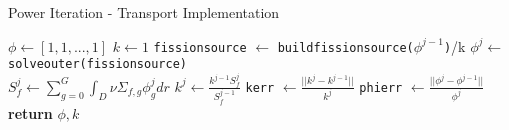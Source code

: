 \begin{algorithm}
\caption{Power Iteration - Transport Implementation}
\begin{algorithmic}
    \State $\phi \gets [1, 1, ..., 1] $ 
    \State $k \gets 1$
     
        \State \texttt{fission\textunderscore source} $\gets$ \texttt{build\textunderscore fission\textunderscore source($\phi^{j-1}$)}/k
        \State $\phi^j \gets$ \texttt{solve\textunderscore outer(fission\textunderscore source)} \\
        \State $S_f^j \gets \sum\limits_{g=0}^{G} \int_D \nu \Sigma_{f, g} \phi_g^jdr$
        \State $k^j \gets \frac{k^{j-1}S_f^j}{S_f^{j-1}}$
        \State \texttt{kerr} $\gets \frac{||k^j - k^{j-1}||}{k^j}$
        \State \texttt{phierr} $\gets \frac{||\phi^j - \phi^{j-1}||}{\phi^j}$
    \EndWhile
    \State \textbf{return} $\phi, k$
\end{algorithmic}
\end{algorithm}

